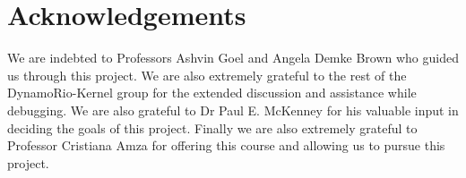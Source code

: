 \documentclass[10pt,twocolumn]{article}
\begin{document}
\section{Acknowledgements}
We are indebted to Professors Ashvin Goel and Angela Demke Brown who
guided us through this project. We are also extremely grateful to the
rest of the DynamoRio-Kernel group for the extended discussion and
assistance while debugging. We are also grateful to Dr Paul E. McKenney
for his valuable input in deciding the goals of this project. Finally
we are also extremely grateful to Professor Cristiana Amza for offering
this course and allowing us to pursue this project.


 
\end{document}
